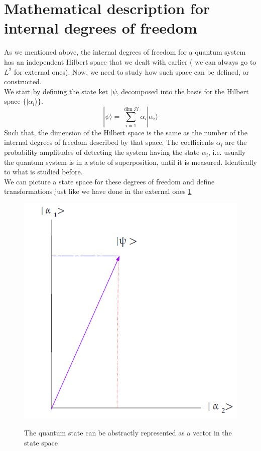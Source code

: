 \section{Mathematical description for internal degrees of freedom}
As we mentioned above, the internal degrees of freedom for a quantum system has an independent Hilbert space that we dealt with earlier ( we can always go to $L^2$ for external ones). Now, we need to study how such space can be defined, or constructed. \\
We start by defining the state ket $ | \psi$, decomposed into the basis for the Hilbert space $ \{ | \alpha_i\rangle\}$. 
\begin{equation}
| \psi \rangle = \sum_{i=1}^{\dim \mathcal H} \alpha_i | \alpha_i\rangle
\end{equation}
Such that, the dimension of the Hilbert space is the same as the number of the internal degrees of freedom described by that space. The coefficients $ \alpha_i$ are the probability amplitudes of detecting the system having the state $ \alpha_i$, i.e. usually the quantum system is in a state of superposition, until it is measured.  Identically to what is studied before. \\
We can picture a state space for these degrees of freedom and define transformations just like we have done in the external ones \ref{statevec}
\begin{figure}	\centering 
	
	\includegraphics[scale=0.4]{./figures/state}
	\label{statevec}
	\caption{ The quantum state can be abstractly represented as a vector in the state space}
\end{figure}
